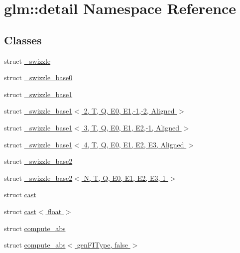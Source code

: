 \hypertarget{namespaceglm_1_1detail}{}\section{glm\+:\+:detail Namespace Reference}
\label{namespaceglm_1_1detail}
\subsection*{Classes}
\begin{DoxyCompactItemize}
\item 
struct \hyperlink{structglm_1_1detail_1_1__swizzle}{\+\_\+swizzle}
\item 
struct \hyperlink{structglm_1_1detail_1_1__swizzle__base0}{\+\_\+swizzle\+\_\+base0}
\item 
struct \hyperlink{structglm_1_1detail_1_1__swizzle__base1}{\+\_\+swizzle\+\_\+base1}
\item 
struct \hyperlink{structglm_1_1detail_1_1__swizzle__base1_3_012_00_01_t_00_01_q_00_01_e0_00_01_e1_00-1_00-2_00_01_aligned_01_4}{\+\_\+swizzle\+\_\+base1$<$ 2, T, Q, E0, E1,-\/1,-\/2, Aligned $>$}
\item 
struct \hyperlink{structglm_1_1detail_1_1__swizzle__base1_3_013_00_01_t_00_01_q_00_01_e0_00_01_e1_00_01_e2_00-1_00_01_aligned_01_4}{\+\_\+swizzle\+\_\+base1$<$ 3, T, Q, E0, E1, E2,-\/1, Aligned $>$}
\item 
struct \hyperlink{structglm_1_1detail_1_1__swizzle__base1_3_014_00_01_t_00_01_q_00_01_e0_00_01_e1_00_01_e2_00_01_e3_00_01_aligned_01_4}{\+\_\+swizzle\+\_\+base1$<$ 4, T, Q, E0, E1, E2, E3, Aligned $>$}
\item 
struct \hyperlink{structglm_1_1detail_1_1__swizzle__base2}{\+\_\+swizzle\+\_\+base2}
\item 
struct \hyperlink{structglm_1_1detail_1_1__swizzle__base2_3_01_n_00_01_t_00_01_q_00_01_e0_00_01_e1_00_01_e2_00_01_e3_00_011_01_4}{\+\_\+swizzle\+\_\+base2$<$ N, T, Q, E0, E1, E2, E3, 1 $>$}
\item 
struct \hyperlink{structglm_1_1detail_1_1cast}{cast}
\item 
struct \hyperlink{structglm_1_1detail_1_1cast_3_01float_01_4}{cast$<$ float $>$}
\item 
struct \hyperlink{structglm_1_1detail_1_1compute__abs}{compute\+\_\+abs}
\item 
struct \hyperlink{structglm_1_1detail_1_1compute__abs_3_01gen_f_i_type_00_01false_01_4}{compute\+\_\+abs$<$ gen\+F\+I\+Type, false $>$}
\item 

\end{DoxyCompactItemize}
